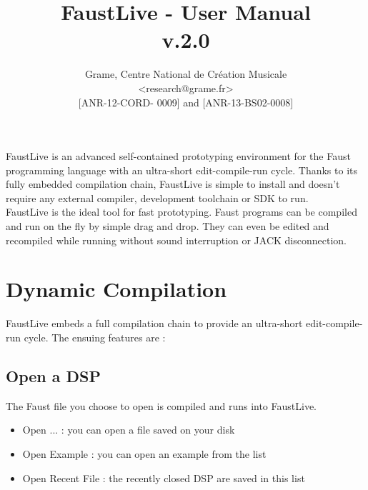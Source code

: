 \documentclass[a4paper]{article}
\begin{document}
\title{FaustLive - User Manual \\ v.2.0}

\author{Grame, Centre National de Création Musicale\\
{\small <research@grame.fr>} \\
\vspace{2mm}
[ANR-12-CORD- 0009] and [ANR-13-BS02-0008]
}

\maketitle


\vspace{\fill}

FaustLive is an advanced self-contained prototyping environment for the Faust programming language with an ultra-short edit-compile-run cycle. Thanks to its fully embedded compilation chain, FaustLive is simple to install and doesn't require any external compiler, development toolchain or SDK to run. \\

FaustLive is the ideal tool for fast prototyping. Faust programs can be compiled and run on the fly by simple drag and drop. They can even be edited and recompiled while running without sound interruption or JACK disconnection.
\vspace{\fill}
\newpage
\tableofcontents

\newpage
\section{Dynamic Compilation}
FaustLive embeds a full compilation chain to provide an ultra-short edit-compile-run cycle.
The ensuing features are :

\subsection{Open a DSP}
The Faust file you choose to open is compiled and runs into FaustLive.
\begin{itemize}
\item Open ... : you can open a file saved on your disk
\item Open Example : you can open an example from the list
\item Open Recent File : the recently closed DSP are saved in this list
\end{itemize}
\end{document}
